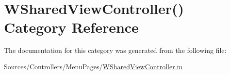 \hypertarget{category_w_shared_view_controller_07_08}{\section{W\-Shared\-View\-Controller() Category Reference}
\label{category_w_shared_view_controller_07_08}
}


The documentation for this category was generated from the following file\-:\begin{DoxyCompactItemize}
\item 
Sources/\-Controllers/\-Menu\-Pages/\hyperlink{_w_shared_view_controller_8m}{W\-Shared\-View\-Controller.\-m}\end{DoxyCompactItemize}
